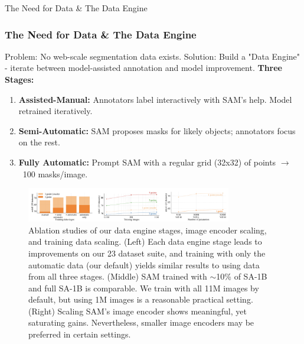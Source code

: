 \documentclass{beamer}
\begin{document}
\begin{frame}{The Need for Data \& The Data Engine}
    \frametitle{The Need for Data \& The Data Engine}
    Problem: No web-scale segmentation data exists.
    Solution: Build a "Data Engine" - iterate between model-assisted annotation and model improvement.
    \textbf{Three Stages:}
    \begin{enumerate}
        \item \textbf{Assisted-Manual:} Annotators label interactively with SAM's help. Model retrained iteratively.
        \item \textbf{Semi-Automatic:} SAM proposes masks for likely objects; annotators focus on the rest.
        \item \textbf{Fully Automatic:} Prompt SAM with a regular grid (32x32) of points $\rightarrow$ ~100 masks/image.
    \end{enumerate}
    \vfill
    \begin{figure}
        \centering
        \includegraphics[width=0.8\textwidth]{figures/data_engine_ablation.png}
        \caption{Ablation studies of our data engine stages, image encoder scaling, and training data scaling. (Left) Each data
        engine stage leads to improvements on our 23 dataset suite, and training with only the automatic data (our default) yields
        similar results to using data from all three stages. (Middle) SAM trained with $\sim$10\% of SA-1B and full SA-1B is comparable.
        We train with all 11M images by default, but using 1M images is a reasonable practical setting. (Right) Scaling SAM's image
        encoder shows meaningful, yet saturating gains. Nevertheless, smaller image encoders may be preferred in certain settings.}
        \label{fig:data_engine}
    \end{figure}
\end{frame}
\end{document}
